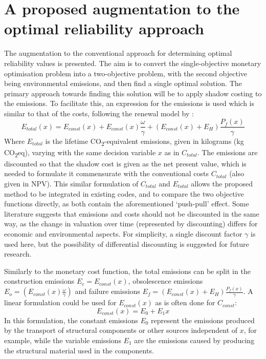 



\section{A proposed augmentation to the optimal reliability approach}
\label{sec:proposed_emission}

The augmentation to the conventional approach for determining optimal reliability values is presented.
The aim is to convert the single-objective monetary optimisation problem into a two-objective problem, with the second objective being environmental emissions, and then find a single optimal solution.
The primary approach towards finding this solution will be to apply shadow costing to the emissions.
To facilitate this, an expression for the emissions is used which is similar to that of the costs, following the renewal model by \citep{Rackwitz2000OptimizationVerification}:
\begin{equation}
    \label{eqn:E_total}
    E_{total}(x) = E_{const}(x) + E_{const}(x) \frac{\omega}{\gamma} + (E_{const}(x) + E_H) \frac{P_f(x)}{\gamma}
\end{equation}
Where $E_{total}$ is the lifetime CO\textsubscript{2}-equivalent emissions, given in kilograms (kg CO\textsubscript{2}eq), varying with the same decision variable $x$ as in $C_{total}$.
The emissions are discounted so that the shadow cost is given as the net present value, which is needed to formulate it commensurate with the conventional costs $C_{total}$ (also given in NPV).
This similar formulation of  $C_{total}$ and $E_{total}$ allows the proposed method to be integrated in existing codes, and to compare the two objective functions directly, as both contain the aforementioned `push-pull' effect.
Some literature suggests that emissions and costs should not be discounted in the same way, as the change in valuation over time (represented by discounting) differs for economic and environmental aspects.
For simplicity, a single discount factor $\gamma$ is used here, but the possibility of differential discounting is suggested for future research.

Similarly to the monetary cost function, the total emissions can be split in the construction emissions $E_c=E_{const}(x)$, obsolescence emissions $E_o=(E_{const}(x)\frac{\omega}{\gamma})$ and failure emissions $E_f=(E_{const}(x)+E_H)\frac{P_f(x)}{\gamma}$.
A linear formulation could be used for $E_{const}(x)$ as is often done for $C_{const}$:
\begin{equation}
    \label{eqn:E_const_lin}
    E_{const}(x) = E_0 + E_1 x 
\end{equation}
In this formulation, the constant emissions $E_0$ represent the emissions produced by the transport of structural components or other sources independent of $x$, for example, while the variable emissions $E_1$ are the emissions caused by producing the structural material used in the components.

